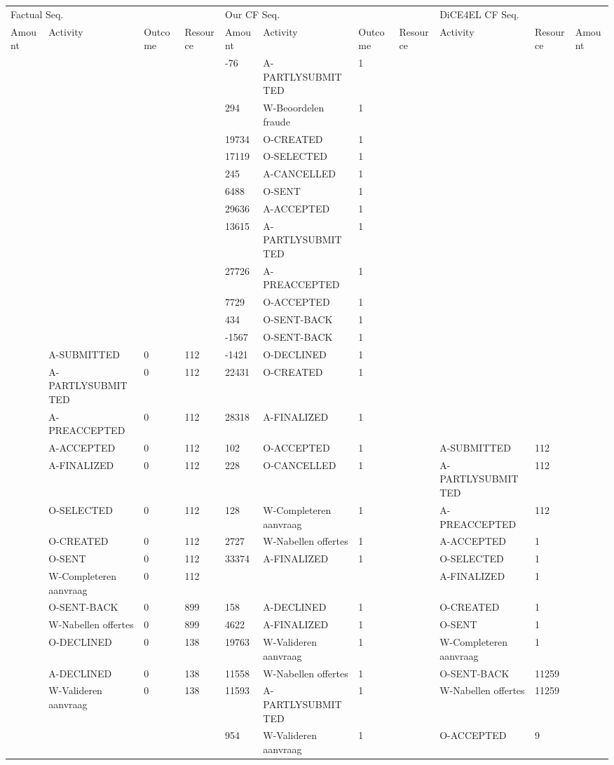 \begin{tabular}{lllllllllll}
\toprule
\multicolumn{4}{l}{Factual Seq.} & \multicolumn{4}{l}{Our CF Seq.} & \multicolumn{3}{l}{DiCE4EL CF Seq.} \\
Amount & Activity & Outcome & Resource & Amount & Activity & Outcome & Resource & Activity & Resource & Amount \\
\midrule
 &  &  &  & -76 & A-PARTLYSUBMITTED & 1 &  &  &  &  \\
 &  &  &  & 294 & W-Beoordelen fraude & 1 &  &  &  &  \\
 &  &  &  & 19734 & O-CREATED & 1 &  &  &  &  \\
 &  &  &  & 17119 & O-SELECTED & 1 &  &  &  &  \\
 &  &  &  & 245 & A-CANCELLED & 1 &  &  &  &  \\
 &  &  &  & 6488 & O-SENT & 1 &  &  &  &  \\
 &  &  &  & 29636 & A-ACCEPTED & 1 &  &  &  &  \\
 &  &  &  & 13615 & A-PARTLYSUBMITTED & 1 &  &  &  &  \\
 &  &  &  & 27726 & A-PREACCEPTED & 1 &  &  &  &  \\
 &  &  &  & 7729 & O-ACCEPTED & 1 &  &  &  &  \\
 &  &  &  & 434 & O-SENT-BACK & 1 &  &  &  &  \\
 &  &  &  & -1567 & O-SENT-BACK & 1 &  &  &  &  \\
 & A-SUBMITTED & 0 & 112 & -1421 & O-DECLINED & 1 &  &  &  &  \\
 & A-PARTLYSUBMITTED & 0 & 112 & 22431 & O-CREATED & 1 &  &  &  &  \\
 & A-PREACCEPTED & 0 & 112 & 28318 & A-FINALIZED & 1 &  &  &  &  \\
 & A-ACCEPTED & 0 & 112 & 102 & O-ACCEPTED & 1 &  & A-SUBMITTED & 112 &  \\
 & A-FINALIZED & 0 & 112 & 228 & O-CANCELLED & 1 &  & A-PARTLYSUBMITTED & 112 &  \\
 & O-SELECTED & 0 & 112 & 128 & W-Completeren aanvraag & 1 &  & A-PREACCEPTED & 112 &  \\
 & O-CREATED & 0 & 112 & 2727 & W-Nabellen offertes & 1 &  & A-ACCEPTED & 1 &  \\
 & O-SENT & 0 & 112 & 33374 & A-FINALIZED & 1 &  & O-SELECTED & 1 &  \\
 & W-Completeren aanvraag & 0 & 112 &  &  &  &  & A-FINALIZED & 1 &  \\
 & O-SENT-BACK & 0 & 899 & 158 & A-DECLINED & 1 &  & O-CREATED & 1 &  \\
 & W-Nabellen offertes & 0 & 899 & 4622 & A-FINALIZED & 1 &  & O-SENT & 1 &  \\
 & O-DECLINED & 0 & 138 & 19763 & W-Valideren aanvraag & 1 &  & W-Completeren aanvraag & 1 &  \\
 & A-DECLINED & 0 & 138 & 11558 & W-Nabellen offertes & 1 &  & O-SENT-BACK & 11259 &  \\
 & W-Valideren aanvraag & 0 & 138 & 11593 & A-PARTLYSUBMITTED & 1 &  & W-Nabellen offertes & 11259 &  \\
 &  &  &  & 954 & W-Valideren aanvraag & 1 &  & O-ACCEPTED & 9 &  \\
\bottomrule
\end{tabular}
